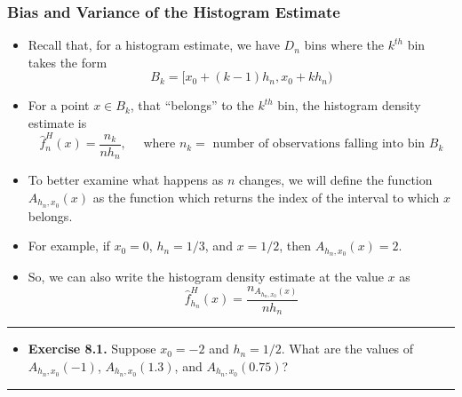 \documentclass[]{book}
\providecommand{\tightlist}{%
  \setlength{\itemsep}{0pt}\setlength{\parskip}{0pt}}
\begin{document}
\hypertarget{bias-and-variance-of-the-histogram-estimate}{%
\subsubsection{Bias and Variance of the Histogram Estimate}\label{bias-and-variance-of-the-histogram-estimate}}

\begin{itemize}
\item
  Recall that, for a histogram estimate, we have \(D_{n}\) bins where the \(k^{th}\) bin
  takes the form
  \begin{equation}
  B_{k} = [x_{0} + (k-1)h_{n}, x_{0} + kh_{n}) \nonumber
  \end{equation}
\item
  For a point \(x \in B_{k}\), that ``belongs'' to the \(k^{th}\) bin, the histogram density estimate is
  \begin{equation}
  \hat{f}_{n}^{H}(x) = \frac{n_{k}}{nh_{n}}, \quad \textrm{ where } n_{k} = \textrm{ number of observations falling into bin } B_{k}
  \end{equation}
\item
  To better examine what happens as \(n\) changes, we will define the function \(A_{h_{n}, x_{0}}(x)\) as the function
  which returns the index of the interval to which \(x\) belongs.
\item
  For example, if \(x_{0} = 0\), \(h_{n} = 1/3\), and \(x = 1/2\), then \(A_{h_{n}, x_{0}}( x ) = 2\).
\item
  So, we can also write the histogram density estimate at the value \(x\) as
  \begin{equation}
  \hat{f}_{h_{n}}^{H}(x) = \frac{n_{A_{h_{n}, x_{0}}(x)}}{ nh_{n} }  \nonumber
  \end{equation}
\end{itemize}

\begin{center}\rule{0.5\linewidth}{\linethickness}\end{center}

\begin{itemize}
\tightlist
\item
  \textbf{Exercise 8.1.} Suppose \(x_{0} = -2\) and \(h_{n} = 1/2\). What are the values of
  \(A_{h_{n}, x_{0}}( -1 )\), \(A_{h_{n}, x_{0}}( 1.3 )\), and \(A_{h_{n}, x_{0}}( 0.75 )\)?
\end{itemize}

\begin{center}\rule{0.5\linewidth}{\linethickness}\end{center}
\end{document}
